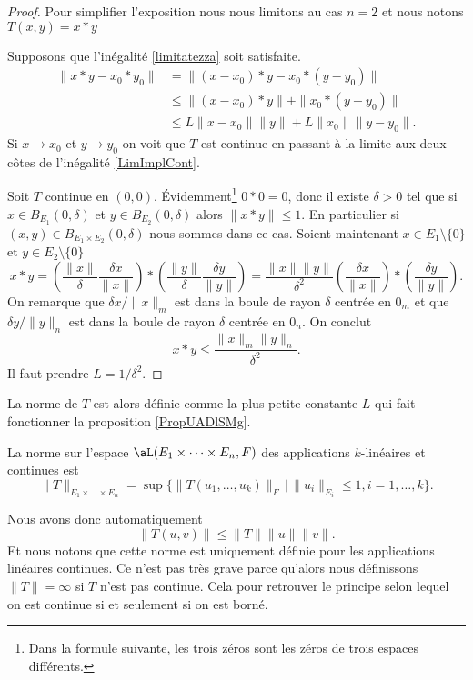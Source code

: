 \begin{proof}
    Pour simplifier l'exposition nous nous limitons au cas $n=2$ et nous notons $T(x,y)=x*y$

    Supposons que l'inégalité \eqref{limitatezza} soit satisfaite. 
    \begin{equation}\label{LimImplCont}
      \begin{aligned}
        \|x*y-x_0*y_0\|&=\|(x-x_0)*y-x_0*(y-y_0)\|\\
    &\leq \|(x-x_0)*y\|+\|x_0*(y-y_0)\|\\
    &\leq L\|x-x_0\|\|y\| + L\|x_0\|\|y-y_0\|.
      \end{aligned}
    \end{equation}
    Si $x\to x_0$ et $y\to y_0$  on voit que $T$ est continue en passant à la limite aux deux côtes de l'inégalité \eqref{LimImplCont}.

    Soit $T$ continue en $(0,0)$. Évidemment\footnote{Dans la formule suivante, les trois zéros sont les zéros de trois espaces différents.} $0*0=0$, donc il existe $\delta>0$ tel que si $x\in B_{E_1}(0,\delta)$ et $y\in B_{E_2}(0,\delta)$ alors $\|x*y\|\leq 1$. En particulier si \( (x,y)\in B_{E_1\times E_2}(0,\delta)\) nous sommes dans ce cas. Soient maintenant  $x\in E_1\setminus\{ 0 \}$  et $y\in E_2\setminus\{ 0\}$
    \begin{equation}
        x*y=\left(\frac{\|x\|}{\delta}\frac{\delta x}{\|x\|}\right)*\left(\frac{\|y\|}{\delta}\frac{\delta y}{\|y\|}\right)
    =\frac{\|x\|\|y\|}{\delta^2} \left(\frac{\delta x}{\|x\|}\right)*\left(\frac{\delta y}{\|y\|}\right).
     \end{equation}
    On remarque que $\delta x/\|x\|_m$ est dans la boule de rayon $\delta$ centrée en $0_m$ et que $\delta y/\|y\|_n$ est dans la boule de rayon $\delta$ centrée en $0_n$. On conclut 
    \[
     x*y\leq \frac{\|x\|_m\|y\|_n}{\delta^2}.
    \]
    Il faut prendre $L=1/\delta^2$.
\end{proof}

La norme de \( T\) est alors définie comme la plus petite constante \( L\) qui fait fonctionner la proposition \ref{PropUADlSMg}.
\begin{definition}  \label{DefKPBYeyG}
	La norme sur l'espace $\aL(E_1\times \cdots\times E_n, F)$ des applications $k$-linéaires et continues est 
	\begin{equation}
        \|T\|_{E_1\times \ldots\times E_n}=\sup\{ \|T(u_1, \ldots,u_k)\|_{F}\,\vert\,\|u_i\|_{E_i}\leq 1, i=1,\ldots, k \}.
	\end{equation}
\end{definition}
Nous avons donc automatiquement
\begin{equation}    \label{EqYLnbRbC}
    \| T(u,v) \|\leq \| T \|\| u \|\| v \|.
\end{equation}
Et nous notons que cette norme est uniquement définie pour les applications linéaires continues. Ce n'est pas très grave parce qu'alors nous définissons \( \| T \|=\infty\) si \( T\) n'est pas continue. Cela pour retrouver le principe selon lequel on est continue si et seulement si on est borné.

